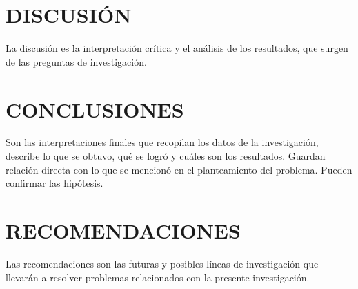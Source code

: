 \section{DISCUSIÓN}

La discusión es la interpretación crítica y el análisis de los resultados, que surgen de las preguntas de investigación.


\newpage
\section{CONCLUSIONES}

Son las interpretaciones finales que recopilan los datos de la investigación, describe lo que se obtuvo, qué se logró y cuáles son los resultados. Guardan relación directa con lo que se mencionó en el planteamiento del problema. Pueden confirmar las hipótesis. 


\newpage
\section{RECOMENDACIONES}

Las recomendaciones son las futuras y posibles líneas de investigación que llevarán a resolver problemas relacionados con la presente investigación.


